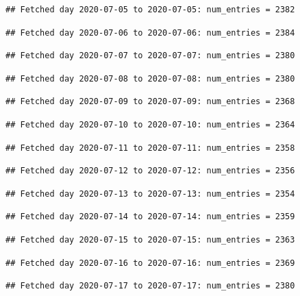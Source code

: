 \documentclass[]{article}
\begin{document}
\begin{verbatim}
## Fetched day 2020-07-05 to 2020-07-05: num_entries = 2382
\end{verbatim}

\begin{verbatim}
## Fetched day 2020-07-06 to 2020-07-06: num_entries = 2384
\end{verbatim}

\begin{verbatim}
## Fetched day 2020-07-07 to 2020-07-07: num_entries = 2380
\end{verbatim}

\begin{verbatim}
## Fetched day 2020-07-08 to 2020-07-08: num_entries = 2380
\end{verbatim}

\begin{verbatim}
## Fetched day 2020-07-09 to 2020-07-09: num_entries = 2368
\end{verbatim}

\begin{verbatim}
## Fetched day 2020-07-10 to 2020-07-10: num_entries = 2364
\end{verbatim}

\begin{verbatim}
## Fetched day 2020-07-11 to 2020-07-11: num_entries = 2358
\end{verbatim}

\begin{verbatim}
## Fetched day 2020-07-12 to 2020-07-12: num_entries = 2356
\end{verbatim}

\begin{verbatim}
## Fetched day 2020-07-13 to 2020-07-13: num_entries = 2354
\end{verbatim}

\begin{verbatim}
## Fetched day 2020-07-14 to 2020-07-14: num_entries = 2359
\end{verbatim}

\begin{verbatim}
## Fetched day 2020-07-15 to 2020-07-15: num_entries = 2363
\end{verbatim}

\begin{verbatim}
## Fetched day 2020-07-16 to 2020-07-16: num_entries = 2369
\end{verbatim}

\begin{verbatim}
## Fetched day 2020-07-17 to 2020-07-17: num_entries = 2380
\end{verbatim}
\end{document}

